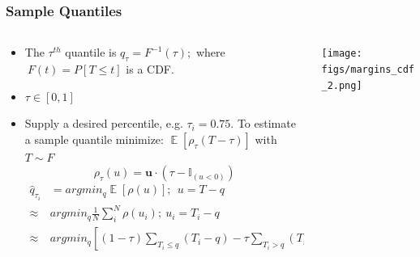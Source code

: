 \documentclass[t, pdftex]{beamer}
\makeatletter
\def\beamer@writeslidentry@miniframesoff{%
    \expandafter\beamer@ifempty\expandafter{\beamer@framestartpage}{}%
    {%
        \clearpage\beamer@notesactions%
    }
}
\newcommand*{\miniframesoff}{\let\beamer@writeslidentry=\beamer@writeslidentry@miniframesoff}
\DeclareMathOperator*{\E}{\mathbb{E}}
\makeatother
\begin{document}
\miniframesoff
\lastframe%


\begin{frame}
\frametitle{Sample Quantiles}
\vspace{-15pt}
\begin{columns}
    \begin{column}{0.5\textwidth}
        \scriptsize{
            \begin{itemize}
                \item The $\tau^{th}$ quantile is $q_\tau = F^{-1}(\tau); $ where $\ F(t)=P[T \leq t]$ is a CDF.
                \item $\tau \in [0, 1]$
                \item Supply a desired percentile, e.g. $\tau_i = 0.75$.
                To estimate a sample quantile minimize: $\E[\rho_\tau(T - \tau)]$ with $T \sim F$
                \[
                \rho_\tau( u) = \mathbf u \cdot (\tau - \mathbb{I}_{( u < 0)})
                \]
                \begin{equation}
                \left.\begin{aligned}
                \hat q_{\tau_i} &= argmin_{q} \E[\rho(u)];\ \  u = T - q  \\
                \approx & argmin_q  \frac{1}{N} \sum_i^N \rho(u_i); \ u_i = T_i - q \\
                \approx & argmin_q \left[ (1-\tau) \sum_{T_i \leq q}( T_i - q ) - \tau \sum_{T_i > q} (T_i - q) \right]
                \end{aligned}\right. \nonumber
                \end{equation}
            \end{itemize}
        }
    \end{column}
    \begin{column}{0.5\textwidth}  %
        \begin{center}
            \texttt{[image: figs/margins\_cdf\_2.png]}
        \end{center}
    \end{column}
\end{columns}
\end{frame}
\end{document}
